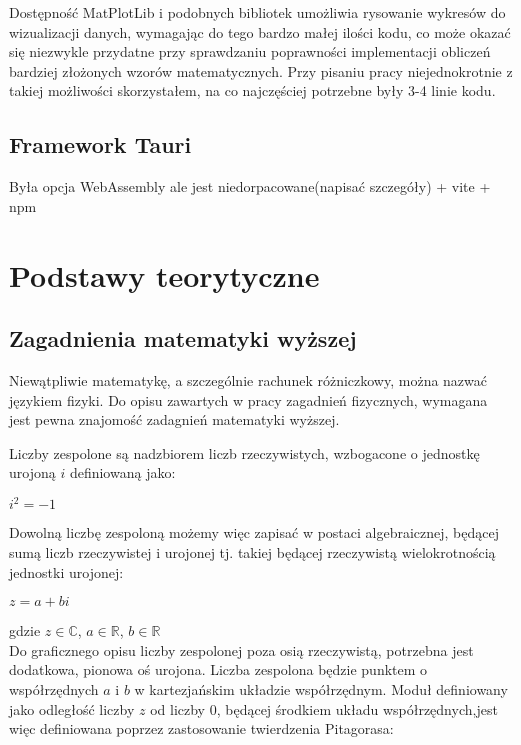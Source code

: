 \documentclass{SGGW-thesis}
\begin{document}
	Dostępność MatPlotLib i podobnych bibliotek umożliwia rysowanie wykresów do wizualizacji danych, wymagając do tego bardzo małej ilości kodu, co może okazać się niezwykle przydatne przy sprawdzaniu poprawności implementacji obliczeń bardziej złożonych wzorów matematycznych. Przy pisaniu pracy niejednokrotnie z takiej możliwości skorzystałem, na co najczęściej potrzebne były 3-4 linie kodu.
	
	\section{Framework Tauri}
	Była opcja WebAssembly ale jest niedorpacowane(napisać szczegóły)
	+ vite + npm
	
\chapter{Podstawy teorytyczne}
	\section{Zagadnienia matematyki wyższej}
	Niewątpliwie matematykę, a szczególnie rachunek różniczkowy, można nazwać językiem fizyki. Do opisu zawartych w pracy zagadnień fizycznych, wymagana jest pewna znajomość zadagnień matematyki wyższej.

	Liczby zespolone są nadzbiorem liczb rzeczywistych, wzbogacone o jednostkę urojoną $i$ definiowaną jako: 
	
	\begin{center}
	$i^2=-1$\\
	\end{center}
	
	Dowolną liczbę zespoloną możemy więc zapisać w postaci algebraicznej, będącej sumą liczb rzeczywistej i urojonej tj. takiej będącej rzeczywistą wielokrotnością jednostki urojonej:
	
	\begin{center}
	$z = a+bi$
	\end{center}
	
	gdzie
	$z \in \mathbb{C}$,
	$a \in \mathbb{R}$,
	$b \in \mathbb{R}$\\
	
	Do graficznego opisu liczby zespolonej poza osią rzeczywistą, potrzebna jest dodatkowa, pionowa oś urojona. Liczba zespolona będzie punktem o współrzędnych $a$ i $b$ w kartezjańskim układzie współrzędnym. Moduł definiowany jako odległość liczby $z$ od liczby $0$, będącej środkiem układu współrzędnych,jest więc definiowana poprzez zastosowanie twierdzenia Pitagorasa:
	
\end{document}
